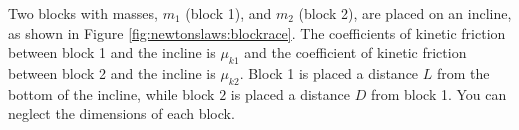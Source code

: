 \question Two blocks with masses, $m_1$ (block 1), and $m_2$ (block 2), are placed on an incline, as shown in Figure \ref{fig:newtonslaws:blockrace}. The coefficients of kinetic friction between block 1 and the incline is $\mu_{k1}$ and the coefficient of kinetic friction between block 2 and the incline is $\mu_{k2}$. Block 1 is placed a distance $L$ from the bottom of the incline, while block $2$ is placed a distance $D$ from block 1. You can neglect the dimensions of each block.
